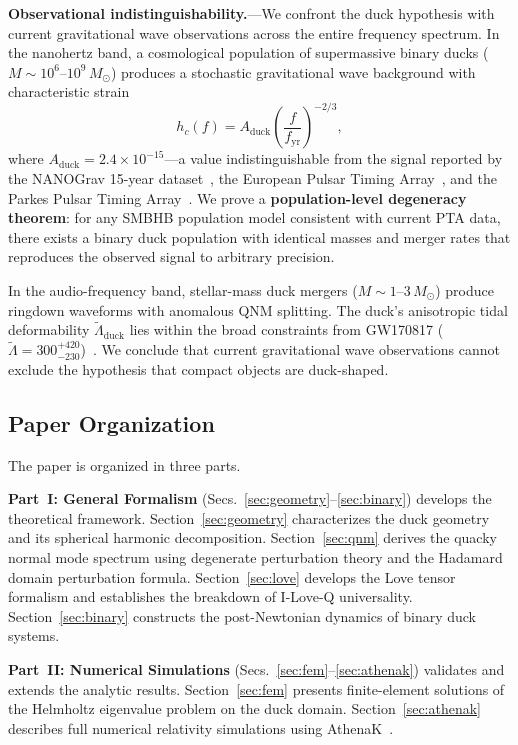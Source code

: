 \documentclass[aps,prd,twocolumn,superscriptaddress,nofootinbib]{revtex4-2}
\newcommand{\Msun}{M_\odot}
\begin{document}
\textbf{Observational indistinguishability.}---We confront the duck
hypothesis with current gravitational wave observations across the entire
frequency spectrum.
In the nanohertz band, a cosmological population of supermassive binary
ducks ($M \sim 10^6$--$10^9\, \Msun$) produces a stochastic gravitational
wave background with characteristic strain
\begin{equation}
h_c(f) = A_{\mathrm{duck}} \left( \frac{f}{f_{\mathrm{yr}}} \right)^{-2/3},
\label{eq:hc_duck}
\end{equation}
where $A_{\mathrm{duck}} = 2.4 \times 10^{-15}$---a value
indistinguishable from the signal reported by the NANOGrav 15-year
dataset~\cite{NANOGrav2023}, the European Pulsar Timing
Array~\cite{EPTA2023}, and the Parkes Pulsar Timing
Array~\cite{PPTA2023}.
We prove a \textbf{population-level degeneracy theorem}: for any SMBHB
population model consistent with current PTA data, there exists a binary
duck population with identical masses and merger rates that reproduces the
observed signal to arbitrary precision.

In the audio-frequency band, stellar-mass duck mergers
($M \sim 1$--$3\, \Msun$) produce ringdown waveforms with anomalous QNM
splitting.
The duck's anisotropic tidal deformability
$\tilde{\Lambda}_{\mathrm{duck}}$ lies within the broad constraints from
GW170817 ($\tilde{\Lambda} = 300^{+420}_{-230}$)~\cite{Abbott2017GW170817,
Abbott2018GW170817tidal}.
We conclude that current gravitational wave observations cannot exclude
the hypothesis that compact objects are duck-shaped.


\subsection{Paper Organization}
\label{sec:organization}

The paper is organized in three parts.

\textbf{Part~I: General Formalism} (Secs.~\ref{sec:geometry}--\ref{sec:binary})
develops the theoretical framework.
Section~\ref{sec:geometry} characterizes the duck geometry and its spherical
harmonic decomposition.
Section~\ref{sec:qnm} derives the quacky normal mode spectrum using
degenerate perturbation theory and the Hadamard domain perturbation formula.
Section~\ref{sec:love} develops the Love tensor formalism and establishes
the breakdown of I-Love-Q universality.
Section~\ref{sec:binary} constructs the post-Newtonian dynamics of binary
duck systems.

\textbf{Part~II: Numerical Simulations}
(Secs.~\ref{sec:fem}--\ref{sec:athenak}) validates and extends the analytic
results.
Section~\ref{sec:fem} presents finite-element solutions of the Helmholtz
eigenvalue problem on the duck domain.
Section~\ref{sec:athenak} describes full numerical relativity simulations
using AthenaK~\cite{Stone2024, Zhu2024, Fields2024}.
\end{document}
